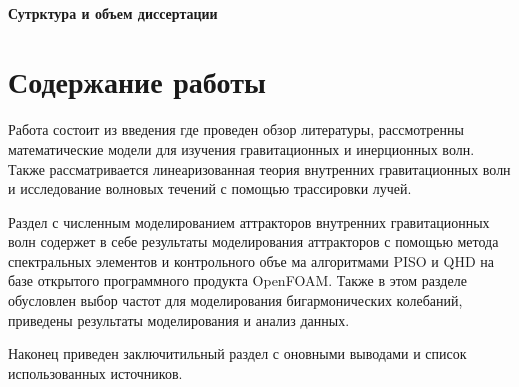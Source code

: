 \documentclass[utf8x]{G7-32} %
\begin{document}
\paragraph{Сутрктура и объем диссертации}



\section{Содержание работы}

Работа состоит из введения где проведен обзор литературы, рассмотренны математические модели для изучения гравитационных и инерционных волн. Также рассматривается линеаризованная теория внутренних гравитационных волн и исследование волновых течений с помощью трассировки лучей.

Раздел с численным моделированием аттракторов внутренних гравитационных волн содержет в себе результаты моделирования аттракторов с помощью метода спектральных элементов и контрольного объе ма алгоритмами PISO и QHD на базе открытого программного продукта OpenFOAM. Также в этом разделе обусловлен выбор частот для моделирования бигармонических колебаний, приведены результаты моделирования и анализ данных.

Наконец приведен заключитильный раздел с оновными выводами и список использованных источников. 


%
%    
%    
%    
%    

\end{document}
